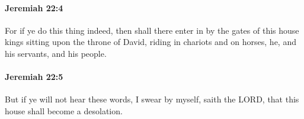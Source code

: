 		\paragraph{Jeremiah 22:4} %
			\label{JEREMIAH-22-4}

			For if ye do this thing indeed, then shall there enter in by the gates of this house kings sitting upon the throne of David, riding in chariots and on horses, he, and his servants, and his people.


		\paragraph{Jeremiah 22:5} %
			\label{JEREMIAH-22-5}

			But if ye will not hear these words, I swear by myself, saith the LORD, that this house shall become a desolation.



